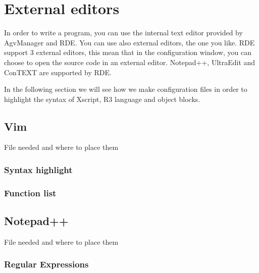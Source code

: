 

\chapter{External editors}
In order to write a program, you can use the internal text editor provided by AgvManager and RDE. You can use also external editors, the one you like. RDE support 3 external editors, this mean that in the configuration window, you can choose to open the source code in an external editor. Notepad++, UltraEdit and ConTEXT are supported by RDE.

In the following section we will see how we make configuration files in order to highlight the syntax of Xscript, R3 language and object blocks.

\section{Vim}
File needed and where to place them

\subsection{Syntax highlight}

\subsection{Function list}

\section{Notepad++}
File needed and where to place them

\subsection{Regular Expressions}


